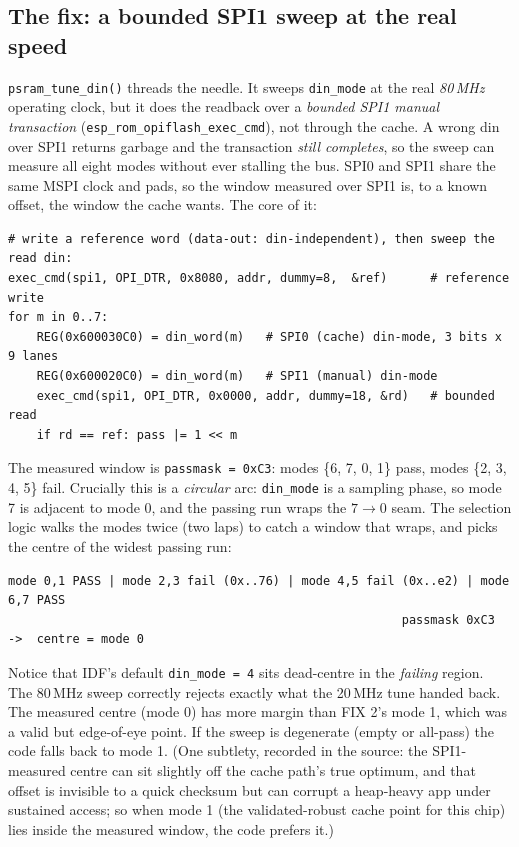\subsection{The fix: a bounded SPI1 sweep at the real speed}

\texttt{psram\_tune\_din()} threads the needle. It sweeps \texttt{din\_mode} at the
real \emph{80\,MHz} operating clock, but it does the readback over a \emph{bounded SPI1
manual transaction} (\texttt{esp\_rom\_opiflash\_exec\_cmd}), not through the cache. A
wrong din over SPI1 returns garbage and the transaction \emph{still completes}, so
the sweep can measure all eight modes without ever stalling the bus. SPI0 and SPI1 share
the same MSPI clock and pads, so the window measured over SPI1 is, to a known offset,
the window the cache wants. The core of it:

\begin{lstlisting}[style=sh]
# write a reference word (data-out: din-independent), then sweep the read din:
exec_cmd(spi1, OPI_DTR, 0x8080, addr, dummy=8,  &ref)      # reference write
for m in 0..7:
    REG(0x600030C0) = din_word(m)   # SPI0 (cache) din-mode, 3 bits x 9 lanes
    REG(0x600020C0) = din_word(m)   # SPI1 (manual) din-mode
    exec_cmd(spi1, OPI_DTR, 0x0000, addr, dummy=18, &rd)   # bounded read
    if rd == ref: pass |= 1 << m
\end{lstlisting}

The measured window is \texttt{passmask = 0xC3}: modes \{6, 7, 0, 1\} pass, modes
\{2, 3, 4, 5\} fail. Crucially this is a \emph{circular} arc: \texttt{din\_mode} is a
sampling phase, so mode 7 is adjacent to mode 0, and the passing run wraps the
$7\rightarrow0$ seam. The selection logic walks the modes twice (two laps) to catch a
window that wraps, and picks the centre of the widest passing run:

\begin{lstlisting}[style=sh]
mode 0,1 PASS | mode 2,3 fail (0x..76) | mode 4,5 fail (0x..e2) | mode 6,7 PASS
                                                       passmask 0xC3  ->  centre = mode 0
\end{lstlisting}

Notice that IDF's default \texttt{din\_mode = 4} sits dead-centre in the \emph{failing}
region. The 80\,MHz sweep correctly rejects exactly what the 20\,MHz tune handed
back. The measured centre (mode 0) has more margin than FIX 2's mode 1, which was a
valid but edge-of-eye point. If the sweep is degenerate (empty or all-pass) the code
falls back to mode 1. (One subtlety, recorded in the source: the SPI1-measured centre
can sit slightly off the cache path's true optimum, and that offset is invisible to a
quick checksum but can corrupt a heap-heavy app under sustained access; so when mode 1
(the validated-robust cache point for this chip) lies inside the measured window,
the code prefers it.)


